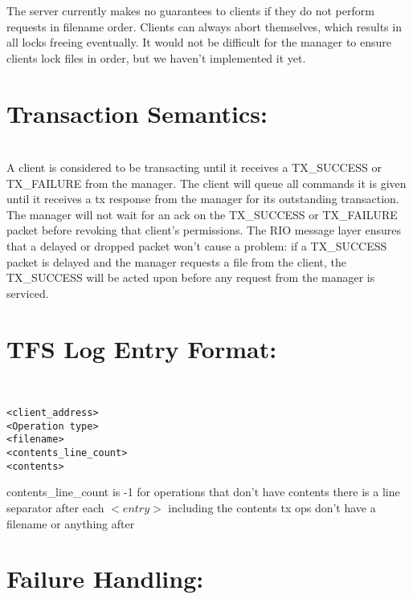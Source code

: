 \documentclass[11pt]{article}
\begin{document}
The server currently makes no guarantees to clients if they do not perform requests in filename order. Clients can always abort themselves, which results in all locks freeing eventually. It would not be difficult for the manager to ensure clients lock files in order, but we haven't implemented it yet. \\

\section{Transaction Semantics:} \\

A client is considered to be transacting until it receives a TX\_SUCCESS or TX\_FAILURE from the manager. 
The client will queue all commands it is given until it receives a tx response from the manager for its outstanding transaction. \\
 
The manager will not wait for an ack on the TX\_SUCCESS or TX\_FAILURE packet before revoking that client's permissions. The RIO message layer ensures that a delayed or dropped packet won't cause a problem: if a TX\_SUCCESS packet is delayed and the manager requests a file from the client, the TX\_SUCCESS will be acted upon before any request from the manager is serviced. \\

\section{TFS Log Entry Format:} \\

\begin{verbatim}
<client_address>
<Operation type>
<filename>
<contents_line_count>
<contents>
\end{verbatim}

contents\_line\_count is -1 for operations that don't have contents
there is a line separator after each $<entry>$ including the contents
tx ops don't have a filename or anything after \\

\section{Failure Handling:} \\
\end{document}
